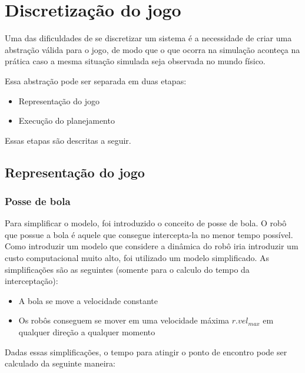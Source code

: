 \section{Discretização do jogo}\label{sec:mapeamento}

Uma das dificuldades de se discretizar um sistema é a necessidade de criar uma
abstração válida para o jogo, de modo que o que ocorra na simulação aconteça na
prática caso a mesma situação simulada seja observada no mundo físico.

Essa abstração pode ser separada em duas etapas:

\begin{itemize}
  \item Representação do jogo
  \item Execução do planejamento
\end{itemize}

Essas etapas são descritas a seguir.

\subsection{Representação do jogo}

\subsubsection{Posse de bola}

Para simplificar o modelo, foi introduzido o conceito de posse
de bola. O robô que possue a bola é aquele que consegue intercepta-la
no menor tempo possível. Como introduzir um modelo que considere
a dinâmica do robô iria introduzir um custo computacional muito alto,
foi utilizado um modelo simplificado. As simplificações são as
seguintes (somente para o calculo do tempo da interceptação):

\begin{itemize}
  \item A bola se move a velocidade constante
  \item Os robôs conseguem se mover em uma velocidade máxima
        $r.vel_{max}$ em qualquer direção a qualquer momento
\end{itemize}

Dadas essas simplificações, o tempo para atingir o ponto de
encontro pode ser calculado da seguinte maneira: 

